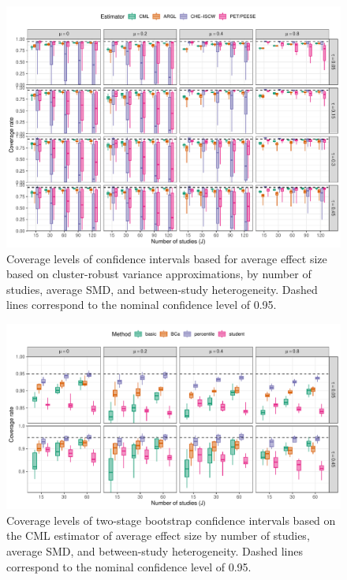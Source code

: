 \documentclass[
  american,
  man, donotrepeattitle,mask,floatsintext]{apa7}
\numberwithin{table}{section}
\numberwithin{equation}{section}
\numberwithin{figure}{section}
\begin{document}
\begin{figure}
\includegraphics{step-function-selection-models-supplementary-materials_files/figure-latex/comparison-coverage-full-1} \caption{Coverage levels of confidence intervals based for average effect size based on cluster-robust variance approximations, by number of studies, average SMD, and between-study heterogeneity. Dashed lines correspond to the nominal confidence level of 0.95.}\label{fig:comparison-coverage-full}
\end{figure}

\begin{figure}
\includegraphics{step-function-selection-models-supplementary-materials_files/figure-latex/CML-coverage-two-stage-1} \caption{Coverage levels of two-stage bootstrap confidence intervals based on the CML estimator of average effect size by number of studies, average SMD, and between-study heterogeneity. Dashed lines correspond to the nominal confidence level of 0.95.}\label{fig:CML-coverage-two-stage}
\end{figure}
\end{document}
